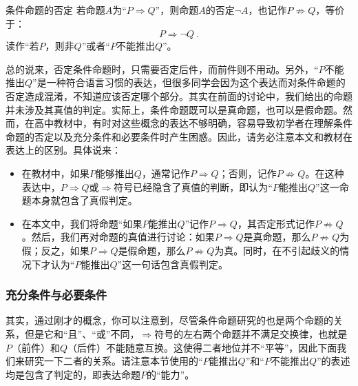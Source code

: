 \begin{definition}{条件命题的否定}
若命题$A$为“$P\Rightarrow Q$”，则命题$A$的否定$\lnot A$，也记作$P\not\Rightarrow Q$，等价于：
\begin{equation}
P\Rightarrow \lnot Q~.
\end{equation}
读作“若$P$，则非$Q$”或者“$P$不能推出$Q$”。
\end{definition}

总的说来，否定条件命题时，只需要否定后件，而前件则不用动。另外，“$P$不能推出$Q$”是一种符合语言习惯的表达，但很多同学会因为这个表达而对条件命题的否定造成混淆，不知道应该否定哪个部分。其实在前面的讨论中，我们给出的命题并未涉及其真值的判定。实际上，条件命题既可以是真命题，也可以是假命题。然而，在高中教材中，有时对这些概念的表达不够明确，容易导致初学者在理解条件命题的否定以及充分条件和必要条件时产生困惑。因此，请务必注意本文和教材在表达上的区别。具体说来：
\begin{itemize}
\item 在教材中，如果$P$能够推出$Q$，通常记作$P\Rightarrow Q$；否则，记作$P\not\Rightarrow Q$。在这种表达中，$P\Rightarrow Q$或$\Rightarrow$符号已经隐含了真值的判断，即认为“$P$能推出$Q$”这一命题本身就包含了真假判定。
\item 在本文中，我们将命题“如果$P$能推出$Q$”记作$P\Rightarrow Q$，其否定形式记作$P\not\Rightarrow Q$。然后，我们再对命题的真值进行讨论：如果$P\Rightarrow Q$是真命题，那么$P\not\Rightarrow Q$为假；反之，如果$P\Rightarrow Q$是假命题，那么$P\not\Rightarrow Q$为真。同时，在不引起歧义的情况下才认为“$P$能推出$Q$”这一句话包含真假判定。
\end{itemize}

\subsubsection{充分条件与必要条件}

其实，通过刚才的概念，你可以注意到，尽管条件命题研究的也是两个命题的关系，但是它和“且”、“或”不同，$\Rightarrow$符号的左右两个命题并不满足交换律，也就是$P$（前件）和$Q$（后件）不能随意互换。这使得二者地位并不“平等”，因此下面我们来研究一下二者的关系。请注意本节使用的“$P$能推出$Q$”和“$P$不能推出$Q$”的表述均是包含了判定的，即表达命题$P$的“能力”。

